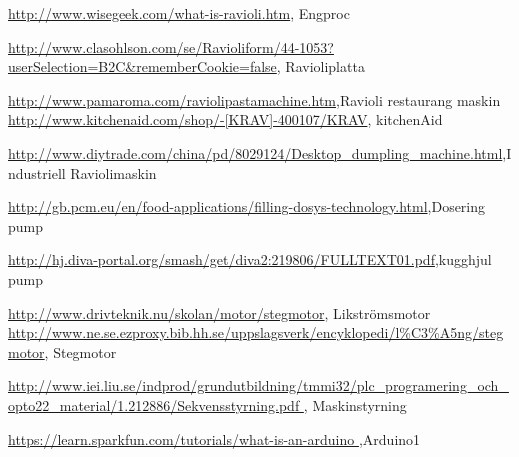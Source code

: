 \documentclass[11pt,a4paper,oneside]{book}
\begin{document}
\backmatter
 
\begin{thebibliography}{1}
\href{http://www.wisegeek.com/what-is-ravioli.htm}{http://www.wisegeek.com/what-is-ravioli.htm}, Engproc

\href{http://www.clasohlson.com/se/Ravioliform/44-1053?userSelection=B2C\&rememberCookie=false}{http://www.clasohlson.com/se/Ravioliform/44-1053?userSelection=B2C\&rememberCookie=false}, Ravioliplatta

\href{http://www.pamaroma.com/raviolipastamachine.htm}{
	http://www.pamaroma.com/raviolipastamachine.htm},Ravioli restaurang maskin	
\href{http://www.kitchenaid.com/shop/-[KRAV]-400107/KRAV/}{http://www.kitchenaid.com/shop/-[KRAV]-400107/KRAV}, kitchenAid

\href{http://www.diytrade.com/china/pd/8029124/Desktop_dumpling_machine.html}{http://www.diytrade.com/china/pd/8029124/Desktop_dumpling_machine.html},Industriell Raviolimaskin

\href{http://gb.pcm.eu/en/food-applications/filling-dosys-technology.html}{http://gb.pcm.eu/en/food-applications/filling-dosys-technology.html},Dosering pump

\href{http://hj.diva-portal.org/smash/get/diva2:219806/FULLTEXT01.pdf}{http://hj.diva-portal.org/smash/get/diva2:219806/FULLTEXT01.pdf},kugghjul pump


\href{http://www.drivteknik.nu/skolan/motor/stegmotor}{http://www.drivteknik.nu/skolan/motor/stegmotor}, Likströmsmotor
\href{http://www.ne.se.ezproxy.bib.hh.se/uppslagsverk/encyklopedi/l\%C3\%A5ng/stegmotor}{http://www.ne.se.ezproxy.bib.hh.se/uppslagsverk/encyklopedi/l\%C3\%A5ng/stegmotor}, Stegmotor

\href{http://www.iei.liu.se/indprod/grundutbildning/tmmi32/plc_programering_och_opto22_material/1.212886/Sekvensstyrning.pdf }{http://www.iei.liu.se/indprod/grundutbildning/tmmi32/plc_programering_och_opto22_material/1.212886/Sekvensstyrning.pdf }, Maskinstyrning



\href{https://learn.sparkfun.com/tutorials/what-is-an-arduino}{https://learn.sparkfun.com/tutorials/what-is-an-arduino },Arduino1


\end{thebibliography}
\end{document}
